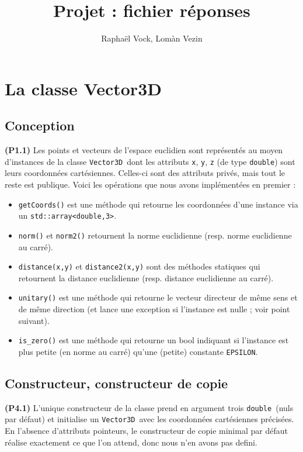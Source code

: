 \documentclass[12pt, letterpaper, twoside]{article}
\title{Projet : fichier réponses}
\author{Raphaël Vock, Lomàn Vezin}
\newcommand{\T}[1]{\texttt{#1}}
\newcommand{\V}[0]{\texttt{Vector3D}}
\newcommand{\double}{\texttt{double}}
\begin{document}
\maketitle
\section{La classe Vector3D}
\subsection{Conception}
\noindent \textbf{(P1.1)} Les points et vecteurs de l'espace euclidien sont représentés au moyen d'instances de la classe \V\ dont les attributs \T{x}, \T{y}, \T{z} (de type \double) sont leurs coordonnées cartésiennes. Celles-ci sont des attributs privés, mais tout le reste est publique. Voici les opérations que nous avons implémentées en premier :

\begin{itemize}

\item \T{getCoords()}  est une méthode qui retourne les coordonnées d'une instance via un \T{std::array<double,3>}.

\item \T{norm()} et \T{norm2()} retournent la norme euclidienne (resp. norme euclidienne au carré).

\item \T{distance(x,y)} et \T{distance2(x,y)} sont des méthodes statiques qui retournent la distance euclidienne (resp. distance euclidienne au carré).

\item \T{unitary()} est une méthode qui retourne le vecteur directeur de même sens et de même direction (et lance une exception si l'instance est nulle ; voir point suivant).

\item \T{is\_zero()} est une méthode qui retourne un bool indiquant si l'instance est plus petite (en norme au carré) qu'une (petite) constante \T{EPSILON}. 
\end{itemize}

\subsection{Constructeur, constructeur de copie}
\noindent \textbf{(P4.1)} L'unique constructeur de la classe prend en argument trois \double\ (nuls par défaut) et initialise un \V\ avec les coordonnées cartésiennes précisées. En l'absence d'attributs pointeurs, le constructeur de copie minimal par défaut réalise exactement ce que l'on attend, donc nous n'en avons pas defini.
\end{document}
